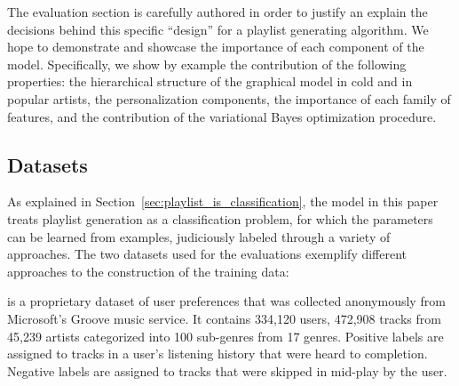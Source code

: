 The evaluation section is carefully authored in order to justify an explain the decisions behind this specific ``design'' for a playlist generating algorithm. We hope to demonstrate and showcase the importance of each component of the model. Specifically, we show by example the contribution of the following properties: the hierarchical structure of the graphical model in cold and in popular artists, the personalization components, the importance of each family of features, and the contribution of the variational Bayes optimization procedure. 

\subsection{Datasets}
As explained in Section~\ref{sec:playlist_is_classification}, the model in this paper treats playlist generation
as a classification problem, for which the parameters can be
learned from examples, judiciously labeled through a variety of approaches.
The  two datasets  used for the evaluations exemplify different approaches to the construction of the training data:

is a proprietary dataset of user preferences that was collected anonymously from Microsoft's Groove music service.
It contains 334,120 users, 472,908 tracks from 45,239 artists categorized into 100 sub-genres from 17 genres. Positive labels
are assigned to tracks in a user's listening history that were heard to completion. Negative labels are assigned to tracks that were skipped in mid-play by the user.

